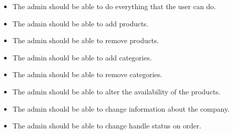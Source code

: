 
\begin{itemize}
    \item The admin should be able to do everything that the user can do.
    \item The admin should be able to add products.
    \item The admin should be able to remove products. 
    \item The admin should be able to add categories. 
    \item The admin should be able to remove categories. 
    \item The admin should be able to alter the availability of the products. 
    \item The admin should be able to change information about the company.
    \item The admin should be able to change handle status on order.
\end{itemize}
